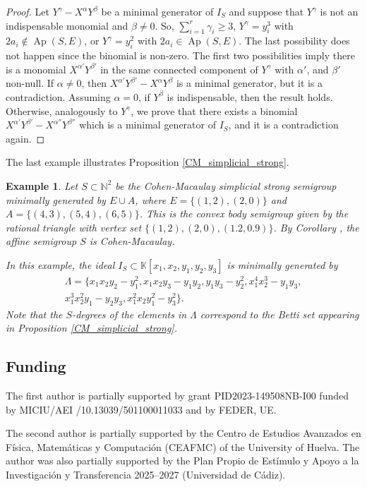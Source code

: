 \documentclass[a4paper,11pt]{article}
\newtheorem{example}[theorem]{Example}
\def\N{\mathbb{N}}
\def\k{\mathbb{K}}
\def\Ap{\operatorname{Ap}}
\begin{document}
{\begin{proof}
Let $Y^\gamma-X^\alpha Y^\beta$ be a minimal generator of $I_S$ and suppose that $Y^\gamma$ is not an indispensable monomial and $\beta\neq 0$. So, $\sum_{i=1}^r\gamma_i \geq 3$, $Y^\gamma=y_i^3$ with $2a_i\notin \Ap(S,E)$, or $Y^\gamma=y_i^2$ with $2a_i\in \Ap(S,E)$. The last possibility does not happen since the binomial is non-zero.
The first two possibilities imply there is a monomial $X^{\alpha'}Y^{\beta'}$ in the same connected component of $Y^\gamma$ with $\alpha'$, and $\beta'$ non-null. If $\alpha\neq 0$, then $X^{\alpha'}Y^{\beta'}-X^\alpha Y^\beta$ is a minimal generator, but it is a contradiction. Assuming $\alpha=0$, if $Y^\beta$ is indispensable, then the result holds. Otherwise, analogously to $Y^\gamma$, we prove that there exists a binomial $X^{\alpha'}Y^{\beta'}-X^{\alpha''} Y^{\beta''}$ which is a minimal generator of $I_S$, and it is a contradiction again.
\end{proof}

The last example illustrates Proposition \ref{CM_simplicial_strong}.

\begin{example}
Let $S\subset \N^2$ be the Cohen-Macaulay simplicial strong semigroup minimally generated by $E\cup A$, where $E= \{(1,2),(2,0)\}$ and $A=\{(4,3),(5,4),(6,5)\}$. This is the convex body semigroup given by the rational triangle with vertex set $\{(1, 2), (2, 0), (1.2, 0.9)\}$. By Corollary \cite[Corollary 12]{G-V-2014_CohenM}, the affine semigroup $S$ is Cohen-Macaulay.

In this example, the ideal $I_S\subset \k[x_1,x_2,y_1,y_2,y_3]$ is minimally generated by
\begin{multline*}\Lambda=\{x_1x_2y_2-y_1^2, x_1x_2y_3-y_1y_2, y_1y_3-y_2^2, x_1^4x_2^3-y_1y_3, \\ x_1^3x_2^2y_1-y_2y_3, x_1^2x_2y_1^2-y_3^2\}.
\end{multline*}
Note that the $S$-degrees of the elements in $\Lambda$ correspond to the Betti set appearing in Proposition \ref{CM_simplicial_strong}.
\end{example}

\subsection*{Funding}

The first author is partially supported by grant
PID2023-149508NB-I00 funded by MICIU/AEI /10.13039/501100011033 and by
FEDER, UE.

The second author is partially supported by the Centro de Estudios Avanzados en Física, Matemáticas y Computación (CEAFMC) of the University of Huelva. The author was also partially supported by the Plan Propio de Estímulo y Apoyo a la Investigación y Transferencia 2025–2027 (Universidad de Cádiz).


}
\end{document}
